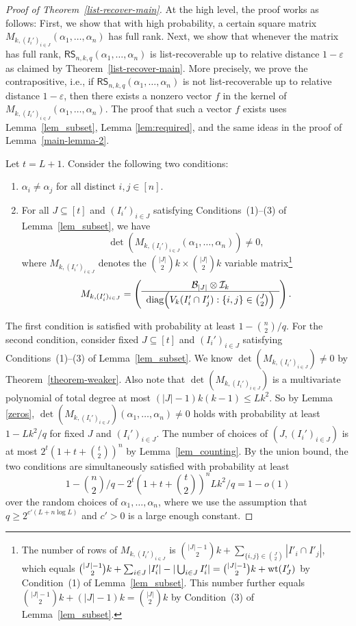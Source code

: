 \documentclass[11pt]{article}
\renewcommand{\epsilon}{\varepsilon}
\newcommand{\wt}{{\rm wt}}
\begin{document}
\begin{proof}[Proof of Theorem~\ref{list-recover-main}]
At the high level, the proof works as follows: First, we show that with high probability, a certain square matrix $M_{k, (I_i')_{i\in J}}(\alpha_1,\dots,\alpha_n)$ has full rank. Next, we show that whenever the matrix has full rank,  $\mathsf{RS}_{n,k,q}(\alpha_1,\dots,\alpha_n)$ is list-recoverable up to relative distance $1-\epsilon$ as claimed by Theorem~\ref{list-recover-main}. More precisely, we prove the contrapositive, i.e., if $\mathsf{RS}_{n,k,q}(\alpha_1,\dots,\alpha_n)$ is not list-recoverable up to relative distance $1-\epsilon$, then there exists a nonzero vector $f$ in the kernel of $M_{k, (I_i')_{i\in J}}(\alpha_1,\dots,\alpha_n)$. The proof that such a vector $f$ exists uses Lemma~\ref{lem_subset}, Lemma \ref{lem:required}, and the same ideas in the proof of Lemma~\ref{main-lemma-2}.


Let $t=L+1$. Consider the following two conditions:
\begin{enumerate}[(1)]
\item $\alpha_i\neq \alpha_j$ for all distinct $i,j\in [n]$.
\item For all $J\subseteq [t]$ and $(I_i')_{i\in J}$ satisfying Conditions~(1)--(3) of Lemma~\ref{lem_subset}, we have
\[
\det(M_{k, (I_i')_{i\in J}}(\alpha_1,\dots,\alpha_n))\neq 0,
\] where $M_{k, (I_i')_{i\in J}}$ denotes the  $\binom{|J|}{2}k\times \binom{|J|}{2}k$ variable matrix\footnote{The number of rows of $M_{k, (I_i')_{i\in J}}$ is $\binom{|J|-1}{2}k + \sum_{\{i,j\}\in \binom{J}{2}} |I'_i\cap I'_j|$, which equals $\binom{|J|-1}{2}k+\sum_{i\in J} |I'_i|-|\bigcup_{i\in J} I'_i|=\binom{|J|-1}{2}k+\wt(I'_J)$ by Condition~(1) of Lemma~\ref{lem_subset}. This number further equals $\binom{|J|-1}{2}k+(|J|-1)k=\binom{|J|}{2}k$ by Condition~(3) of Lemma~\ref{lem_subset}.}
\[
M_{k, (I_i')_{i\in J}}=\left(
  \begin{array}{c}
    \mathcal{B}_{|J|}\otimes \mathcal{I}_k  \\\hline
  {\rm diag}\Big(V_k(I_i'\cap I_j'): \{i,j\}\in \binom{J}{2}\Big) \\
  \end{array}
\right).
\]
\end{enumerate}
The first condition is satisfied with probability at least $1-\binom{n}{2}/q$.
For the second condition, consider fixed $J\subseteq [t]$ and $(I_i')_{i\in J}$  satisfying Conditions~(1)--(3) of Lemma~\ref{lem_subset}.
We  know $\det(M_{k, (I_i')_{i\in J}})\neq 0$ by Theorem~\ref{theorem-weaker}.
 Also note that $\det(M_{k, (I_i')_{i\in J}})$ is a multivariate polynomial of total degree at most $(|J|-1)k(k-1)\leq Lk^2$.
So by Lemma \ref{zeros}, $\det(M_{k, (I_i')_{i\in J}})(\alpha_1,\dots,\alpha_n)\neq 0$ holds with probability at least
$1-Lk^2/q$ for  fixed $J$ and $(I_i')_{i\in J}$. The number of choices of $(J, (I_i')_{i\in J})$ is at most  $2^t(1+t+\binom{t}{2})^n$ by Lemma~\ref{lem_counting}. By the union bound, the two conditions are simultaneously satisfied with probability at least
\[
1-\binom{n}{2}/q-2^t\left(1+t+\binom{t}{2}\right)^n Lk^2/q=1-o(1)
\]
over the random choices of $\alpha_1,\dots,\alpha_n$, where we use the assumption that $q\geq 2^{c'(L+n\log L)}$ and $c'>0$ is a large enough constant.



\end{proof}
\end{document}
